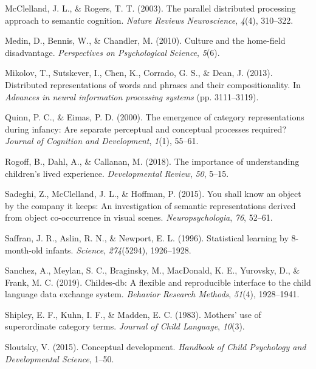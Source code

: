 \documentclass[english,,man,floatsintext]{apa6}
\begin{document}
\leavevmode\hypertarget{ref-mcclelland2003}{}%
McClelland, J. L., \& Rogers, T. T. (2003). The parallel distributed processing approach to semantic cognition. \emph{Nature Reviews Neuroscience}, \emph{4}(4), 310--322.

\leavevmode\hypertarget{ref-medin2010}{}%
Medin, D., Bennis, W., \& Chandler, M. (2010). Culture and the home-field disadvantage. \emph{Perspectives on Psychological Science}, \emph{5}(6).

\leavevmode\hypertarget{ref-mikolov2013}{}%
Mikolov, T., Sutskever, I., Chen, K., Corrado, G. S., \& Dean, J. (2013). Distributed representations of words and phrases and their compositionality. In \emph{Advances in neural information processing systems} (pp. 3111--3119).

\leavevmode\hypertarget{ref-quinn2000}{}%
Quinn, P. C., \& Eimas, P. D. (2000). The emergence of category representations during infancy: Are separate perceptual and conceptual processes required? \emph{Journal of Cognition and Development}, \emph{1}(1), 55--61.

\leavevmode\hypertarget{ref-rogoff2018}{}%
Rogoff, B., Dahl, A., \& Callanan, M. (2018). The importance of understanding children's lived experience. \emph{Developmental Review}, \emph{50}, 5--15.

\leavevmode\hypertarget{ref-sadeghi2015}{}%
Sadeghi, Z., McClelland, J. L., \& Hoffman, P. (2015). You shall know an object by the company it keeps: An investigation of semantic representations derived from object co-occurrence in visual scenes. \emph{Neuropsychologia}, \emph{76}, 52--61.

\leavevmode\hypertarget{ref-saffran1996}{}%
Saffran, J. R., Aslin, R. N., \& Newport, E. L. (1996). Statistical learning by 8-month-old infants. \emph{Science}, \emph{274}(5294), 1926--1928.

\leavevmode\hypertarget{ref-sanchez2019}{}%
Sanchez, A., Meylan, S. C., Braginsky, M., MacDonald, K. E., Yurovsky, D., \& Frank, M. C. (2019). Childes-db: A flexible and reproducible interface to the child language data exchange system. \emph{Behavior Research Methods}, \emph{51}(4), 1928--1941.

\leavevmode\hypertarget{ref-shipley1983}{}%
Shipley, E. F., Kuhn, I. F., \& Madden, E. C. (1983). Mothers' use of superordinate category terms. \emph{Journal of Child Language}, \emph{10}(3).

\leavevmode\hypertarget{ref-sloutsky2015}{}%
Sloutsky, V. (2015). Conceptual development. \emph{Handbook of Child Psychology and Developmental Science}, 1--50.
\end{document}
